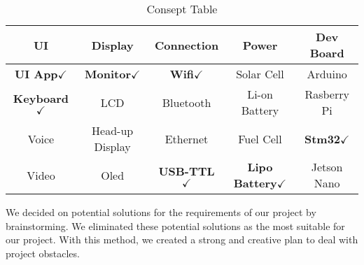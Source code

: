\documentclass[12pt]{article}
\begin{document}
	\begin{table}[H]
		\centering
		\begin{tabular}{|c|c|c|c|c|}
			\hline
			UI & Display & Connection & Power & Dev Board \\
			\hline
			\textbf{UI App}$\checkmark$
			&\textbf{Monitor}$\checkmark$
			& \textbf{Wifi}$\checkmark$
			& Solar Cell & Arduino\\
			\hline
			\textbf{Keyboard}$\checkmark$
			& LCD & Bluetooth & Li-on Battery & Rasberry Pi \\
			\hline
			Voice & Head-up Display & Ethernet & Fuel Cell &\textbf{Stm32}$\checkmark$
			\\
			\hline
			Video & Oled &\textbf{USB-TTL}$\checkmark$  & \textbf{Lipo Battery}$\checkmark$
			& Jetson Nano \\
			\hline
		\end{tabular}
		\caption{Consept Table}
	\end{table}
	We decided on potential solutions for the requirements of our project by brainstorming. We eliminated these potential solutions as the most suitable for our project. With this method, we created a strong and creative plan to deal with project obstacles. 
	
	
	\vskip 10cm
	
	
\end{document}

